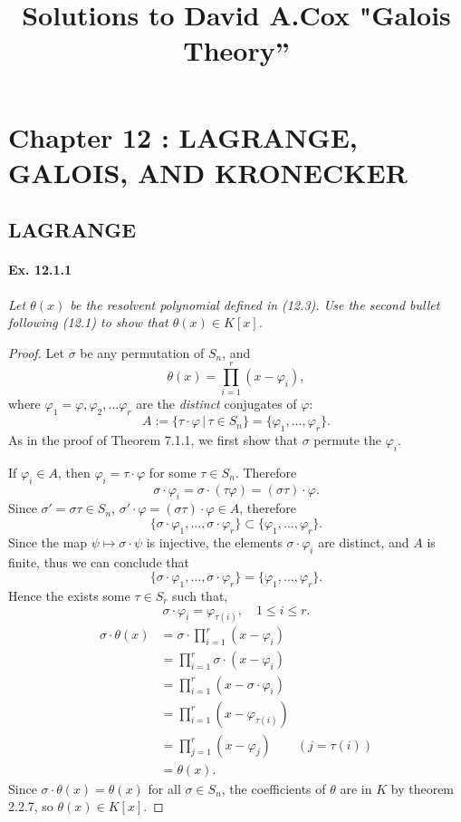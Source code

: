 \documentclass[11pt,a4paper]{article}
\title{Solutions to David A.Cox  "Galois Theory''}
\begin{document}
\section{Chapter 12 : LAGRANGE, GALOIS, AND KRONECKER}

\subsection{LAGRANGE}

\paragraph{Ex. 12.1.1}

{\it Let $\theta(x)$ be the resolvent polynomial defined in (12.3). Use the second bullet following (12.1) to show that $\theta(x) \in K[x]$.
}

\begin{proof} Let $\sigma$ be any permutation of $S_n$, and
$$\theta(x) = \prod_{i=1}^r (x-\varphi_i),$$
where $\varphi_1 = \varphi, \varphi_2,\ldots \varphi_r$ are the {\it distinct} conjugates of $\varphi$:
$$A := \{\tau \cdot \varphi\, | \, \tau \in S_n\} = \{\varphi_1,\ldots,\varphi_r\}.$$
As in the proof of Theorem 7.1.1, we first show that $\sigma$ permute the $\varphi_i$.

If $\varphi_i \in A$, then $\varphi_i = \tau \cdot \varphi$ for some $\tau \in S_n$. Therefore
$$\sigma \cdot \varphi_i = \sigma \cdot (\tau \varphi) = (\sigma \tau) \cdot \varphi.$$
Since $\sigma' = \sigma \tau \in S_n$, $\sigma' \cdot \varphi = (\sigma \tau) \cdot \varphi \in A$, therefore
$$\{\sigma \cdot \varphi_1,\ldots, \sigma \cdot \varphi_r\} \subset \{\varphi_1,\ldots,\varphi_r\}.$$
Since the map $\psi \mapsto \sigma \cdot \psi$ is injective, the elements $\sigma \cdot \varphi_i$ are distinct, and $A$ is finite, thus we can conclude that 
$$\{\sigma \cdot \varphi_1,\ldots, \sigma \cdot \varphi_r\} = \{\varphi_1,\ldots,\varphi_r\}.$$
Hence the exists some $\tau \in S_r$ such that, 
$$\sigma \cdot \varphi_i =\varphi_{\tau(i)},\quad 1\leq i \leq r.$$
\begin{align*}
\sigma \cdot \theta(x) &= \sigma \cdot  \prod_{i=1}^r (x-\varphi_i)\\
&= \prod_{i=1}^r \sigma \cdot (x-\varphi_i)\\
&= \prod_{i=1}^r (x-  \sigma \cdot \varphi_i)\\
&= \prod_{i=1}^r   (x-\varphi_{\tau(i)})\\
&= \prod_{j=1}^r   (x-\varphi_j) \qquad (j = \tau(i))\\
&=\theta(x).
\end{align*}
Since $\sigma \cdot \theta(x)  = \theta(x)$ for all $\sigma \in S_n$, the coefficients of $\theta$ are in $K$ by theorem 2.2.7, so $\theta(x) \in K[x]$.
\end{proof}
\end{document}
